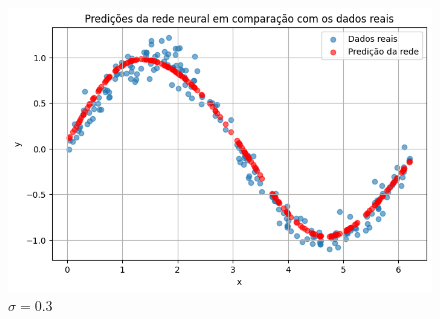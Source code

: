 \begin{figure}[htb]
\begin{minipage}{0.45\textwidth}
		\includegraphics[width=\textwidth]{./0803_imgs/0365_tarefa05/png-241110-192925288-2928491021629715945.png}
	\end{minipage}
	\vspace{2Ex}
	\begin{minipage}{0.45\textwidth}
		\centering
		\caption{$\sigma=0.3$}\label{fig:tarefa05:03:predicoes}
		

\end{minipage}
\end{figure}

